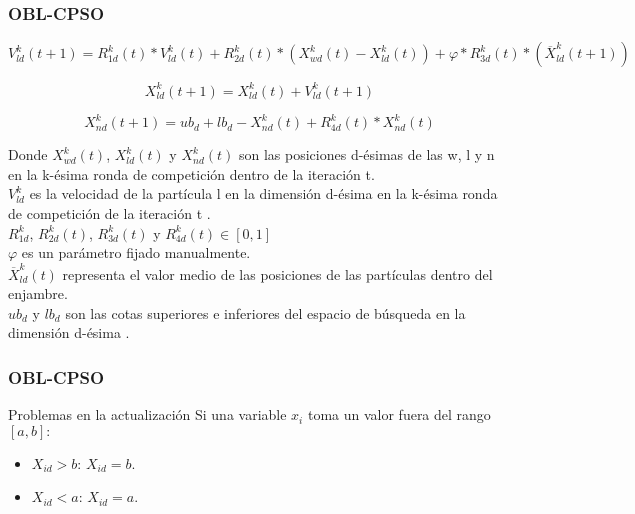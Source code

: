 \begin{frame}[shrink=20]
\frametitle{OBL-CPSO}
\begin{block}{}
\begin{equation}\label{eq:7}
    V^{k}_{ld}(t+1) = R^{k}_{1d}(t) * V^{k}_{ld}(t) + R^{k}_{2d}(t) * (X^{k}_{wd}(t) - X^{k}_{ld}(t)) + \varphi * R^{k}_{3d}(t) * (\overline{X}^{k}_{ld}(t+1)) 
\end{equation}

\begin{equation}\label{eq:8}
     X^{k}_{ld}(t+1) = X^{k}_{ld}(t) + V^{k}_{ld}(t+1)
\end{equation}

\begin{equation}\label{eq:9}
     X^{k}_{nd}(t+1) = ub_{d} + lb_{d} - X^{k}_{nd}(t) + R^{k}_{4d}(t) * X^{k}_{nd}(t)
\end{equation}

\end{block}
\begin{block}{}
Donde $X^{k}_{wd}(t)$, $ X^{k}_{ld}(t)$ y $ X^{k}_{nd}(t)$ son las posiciones d-ésimas de las w, l y n en la k-ésima ronda de competición dentro de la iteración t. \\
$V^{k}_{ld}$ es la velocidad de la partícula l en la dimensión d-ésima en la k-ésima ronda de competición de la iteración t \cite{oblcpso}. \\
$R^{k}_{1d}$, $R^{k}_{2d}(t)$, $R^{k}_{3d}(t)$ y $R^{k}_{4d}(t) \in [0, 1]$ \\
$\varphi$ es un parámetro fijado manualmente. \\
$\overline{X}^{k}_{ld}(t)$ representa el valor medio de las posiciones de las partículas dentro del enjambre. \\
$ub_{d}$ y $lb_{d}$ son las cotas superiores e inferiores del espacio de búsqueda en la dimensión d-ésima \cite{oblcpso}. \\
\end{block}
\end{frame}

\begin{frame}
\frametitle{OBL-CPSO}
\begin{block}{Problemas en la actualización}
Si una variable $x_{i}$ toma un valor fuera del rango $[a,b]: $
\begin{itemize}
    \item \textbf{$X_{id} > b$}: $X_{id} = b$.
    \item \textbf{$X_{id} < a$}: $X_{id} = a$.
    \end{itemize}
\end{block}
\end{frame}


